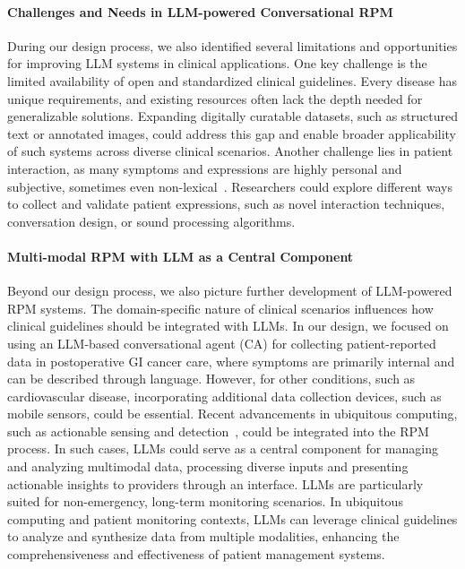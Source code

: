 \paragraph{Challenges and Needs in LLM-powered Conversational RPM}
During our design process, we also identified several limitations and opportunities for improving LLM systems in clinical applications. One key challenge is the limited availability of open and standardized clinical guidelines. Every disease has unique requirements, and existing resources often lack the depth needed for generalizable solutions. Expanding digitally curatable datasets, such as structured text or annotated images, could address this gap and enable broader applicability of such systems across diverse clinical scenarios. 
Another challenge lies in patient interaction, as many symptoms and expressions are highly personal and subjective, sometimes even non-lexical~\cite{tran2023mm}. Researchers could explore different ways to collect and validate patient expressions, such as novel interaction techniques, conversation design, or sound processing algorithms.

\paragraph{Multi-modal RPM with LLM as a Central Component}
Beyond our design process, we also picture further development of LLM-powered RPM systems. The domain-specific nature of clinical scenarios influences how clinical guidelines should be integrated with LLMs. In our design, we focused on using an LLM-based conversational agent (CA) for collecting patient-reported data in postoperative GI cancer care, where symptoms are primarily internal and can be described through language. However, for other conditions, such as cardiovascular disease, incorporating additional data collection devices, such as mobile sensors, could be essential. Recent advancements in ubiquitous computing, such as actionable sensing and detection~\cite{adler2024beyond}, could be integrated into the RPM process. In such cases, LLMs could serve as a central component for managing and analyzing multimodal data, processing diverse inputs and presenting actionable insights to providers through an interface.
LLMs are particularly suited for non-emergency, long-term monitoring scenarios. In ubiquitous computing and patient monitoring contexts, LLMs can leverage clinical guidelines to analyze and synthesize data from multiple modalities, enhancing the comprehensiveness and effectiveness of patient management systems.


